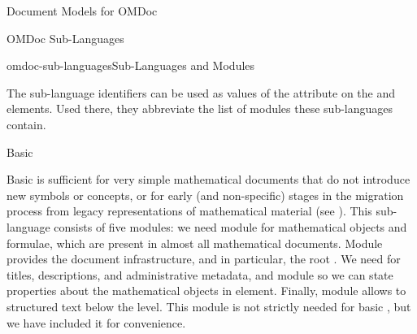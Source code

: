 \begin{module}[id=document-model]
\begin{omgroup}[id=document-model]{Document Models for OMDoc}
\begin{omgroup}[id=sub-languages]{OMDoc Sub-Languages}
\begin{module}[id=sub-languages]
\begin{myfig}{omdoc-sub-languages}{\omdoc Sub-Languages and Modules}
\end{myfig}

The sub-language identifiers can be used as values of the {}
attribute on the  and  elements. Used there, they
abbreviate the list of modules these sub-languages contain.


\begin{omgroup}[id=sub-languages.basic]{Basic \omdoc}

Basic \omdoc is sufficient for very simple mathematical documents that do not introduce
new symbols or concepts, or for early (and non-specific) stages in the migration process
from legacy representations of mathematical material (see ). This
\omdoc sub-language consists of five modules: we need module {} for
mathematical objects and formulae, which are present in almost all mathematical documents.
Module {} provides the document infrastructure, and in particular, the
root  . We need {} for
titles, descriptions, and administrative metadata, and module {} so we
can state properties about the mathematical objects in  element.
Finally, module {} allows to structured text below the 
level. This module is not strictly needed for basic \omdoc, but we have included it for
convenience.
\end{omgroup}


\end{module}
\end{omgroup}
\end{omgroup}
\end{module}
